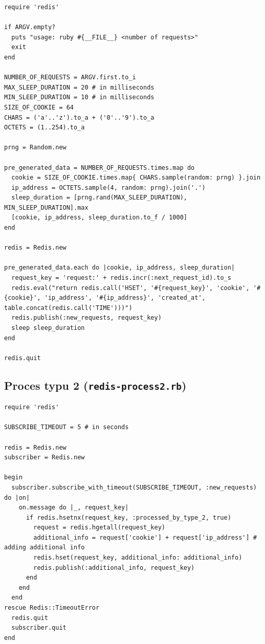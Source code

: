 \documentclass[a4paper,11pt]{article}
\begin{document}
\begin{lstlisting}
require 'redis'

if ARGV.empty?
  puts "usage: ruby #{__FILE__} <number of requests>"
  exit
end

NUMBER_OF_REQUESTS = ARGV.first.to_i
MAX_SLEEP_DURATION = 20 # in milliseconds
MIN_SLEEP_DURATION = 10 # in milliseconds
SIZE_OF_COOKIE = 64
CHARS = ('a'..'z').to_a + ('0'..'9').to_a
OCTETS = (1..254).to_a

prng = Random.new

pre_generated_data = NUMBER_OF_REQUESTS.times.map do
  cookie = SIZE_OF_COOKIE.times.map{ CHARS.sample(random: prng) }.join
  ip_address = OCTETS.sample(4, random: prng).join('.')
  sleep_duration = [prng.rand(MAX_SLEEP_DURATION), MIN_SLEEP_DURATION].max
  [cookie, ip_address, sleep_duration.to_f / 1000]
end

redis = Redis.new

pre_generated_data.each do |cookie, ip_address, sleep_duration|
  request_key = 'request:' + redis.incr(:next_request_id).to_s
  redis.eval("return redis.call('HSET', '#{request_key}', 'cookie', '#{cookie}', 'ip_address', '#{ip_address}', 'created_at', table.concat(redis.call('TIME')))")
  redis.publish(:new_requests, request_key)
  sleep sleep_duration
end

redis.quit
\end{lstlisting}


\subsection{Proces typu 2 (\texttt{redis-process2.rb})}

\begin{lstlisting}
require 'redis'

SUBSCRIBE_TIMEOUT = 5 # in seconds

redis = Redis.new
subscriber = Redis.new

begin
  subscriber.subscribe_with_timeout(SUBSCRIBE_TIMEOUT, :new_requests) do |on|
    on.message do |_, request_key|
      if redis.hsetnx(request_key, :processed_by_type_2, true)
        request = redis.hgetall(request_key)
        additional_info = request['cookie'] + request['ip_address'] # adding additional info
        redis.hset(request_key, additional_info: additional_info)
        redis.publish(:additional_info, request_key)
      end
    end
  end
rescue Redis::TimeoutError
  redis.quit
  subscriber.quit
end
\end{lstlisting}
\end{document}
